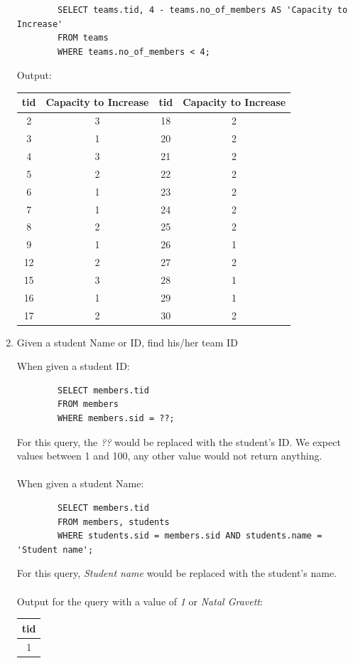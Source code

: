 \documentclass[11pt,letterpaper]{article}
\begin{document}
\begin{enumerate}
		\begin{verbatim}
		SELECT teams.tid, 4 - teams.no_of_members AS 'Capacity to Increase' 
		FROM teams 
		WHERE teams.no_of_members < 4;
		\end{verbatim}
		Output:
		\begin{center}
			\begin{tabular}{ | c | c | c | c | }
				\hline
				tid & Capacity to Increase & tid & Capacity to Increase\\
				\hline
				2 & 3 & 18 & 2 \\
				3 & 1 & 20 & 2 \\
				4 & 3 & 21 & 2 \\
				5 & 2 & 22 & 2 \\
				6 & 1 & 23 & 2 \\
				7 & 1 & 24 & 2 \\
				8 & 2 & 25 & 2 \\
				9 & 1 & 26 & 1 \\
				12 & 2 & 27 & 2 \\
				15 & 3 & 28 & 1 \\
				16 & 1 & 29 & 1 \\
				17 & 2 & 30 & 2 \\
				\hline
			\end{tabular}
		\end{center}
		
		\item Given a student Name or ID, find his/her team ID
		
		When given a student ID:
		\begin{verbatim}
		SELECT members.tid 
		FROM members 
		WHERE members.sid = ??;
		\end{verbatim}
		For this query, the \textit{??} would be replaced with the student's ID. We expect values between 1 and 100, any other value would not return anything.\\
		\\
		When given a student Name:
		\begin{verbatim}
		SELECT members.tid 
		FROM members, students 
		WHERE students.sid = members.sid AND students.name = 'Student name';
		\end{verbatim}
		For this query, \textit{Student name} would be replaced with the student's name.\\
		\\
		Output for the query with a value of \textit{1} or \textit{Natal Gravett}:
		\begin{center}
			\begin{tabular}{ | c | }
				\hline
				tid \\
				\hline
				1\\
				\hline
			\end{tabular}
		\end{center}
		

\end{enumerate}
\end{document}
